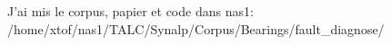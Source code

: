 J'ai mis le corpus, papier et code dans nas1:
/home/xtof/nas1/TALC/Synalp/Corpus/Bearings/fault_diagnose/

